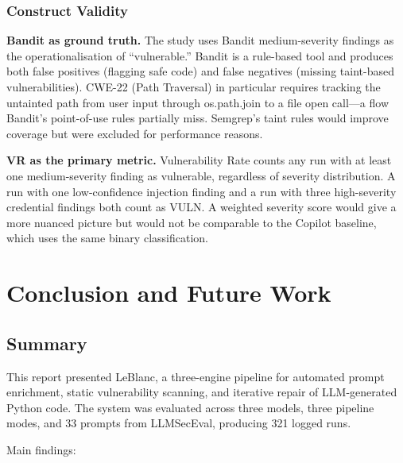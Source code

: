 \documentclass[12pt,a4paper]{report}
\begin{document}
\subsection{Construct Validity}

\textbf{Bandit as ground truth.} The study uses Bandit medium-severity findings as
the operationalisation of ``vulnerable.'' Bandit is a rule-based tool and
produces both false positives (flagging safe code) and false negatives (missing
taint-based vulnerabilities). CWE-22 (Path Traversal) in particular requires
tracking the untainted path from user input through os.path.join to a file open
call---a flow Bandit's point-of-use rules partially miss. Semgrep's taint rules
would improve coverage but were excluded for performance reasons.

\textbf{VR as the primary metric.} Vulnerability Rate counts any run with at
least one medium-severity finding as vulnerable, regardless of severity
distribution. A run with one low-confidence injection finding and a run with
three high-severity credential findings both count as VULN. A weighted severity
score would give a more nuanced picture but would not be comparable to the
Copilot baseline, which uses the same binary classification.

\chapter{Conclusion and Future Work}
\label{ch:conclusion}

\section{Summary}
\label{sec:summary}

This report presented LeBlanc, a three-engine pipeline for automated prompt
enrichment, static vulnerability scanning, and iterative repair of LLM-generated
Python code. The system was evaluated across three models, three pipeline modes,
and 33 prompts from LLMSecEval, producing 321 logged runs.

Main findings:
\end{document}
